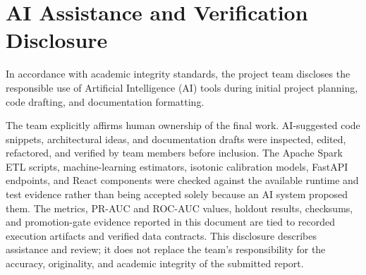 \section*{AI Assistance and Verification Disclosure}

In accordance with academic integrity standards, the project team discloses the responsible use of Artificial Intelligence (AI) tools during initial project planning, code drafting, and documentation formatting.

The team explicitly affirms human ownership of the final work. AI-suggested code snippets, architectural ideas, and documentation drafts were inspected, edited, refactored, and verified by team members before inclusion. The Apache Spark ETL scripts, machine-learning estimators, isotonic calibration models, FastAPI endpoints, and React components were checked against the available runtime and test evidence rather than being accepted solely because an AI system proposed them. The metrics, PR-AUC and ROC-AUC values, holdout results, checksums, and promotion-gate evidence reported in this document are tied to recorded execution artifacts and verified data contracts. This disclosure describes assistance and review; it does not replace the team's responsibility for the accuracy, originality, and academic integrity of the submitted report.
